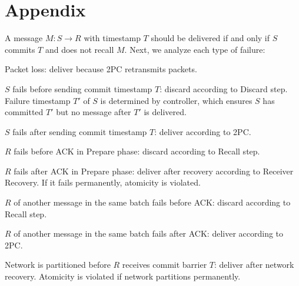\section{Appendix}
\label{appx:proof}


A message $M: S \rightarrow R$ with timestamp $T$ should be delivered if and only if $S$ commits $T$ and does not recall $M$. Next, we analyze each type of failure:
\begin{ecompact}
	\item Packet loss: deliver because 2PC retransmits packets.
	\item $S$ fails before sending commit timestamp $T$: discard according to Discard step. Failure timestamp $T'$ of $S$ is determined by controller, which ensures $S$ has committed $T'$ but no message after $T'$ is delivered.
	\item $S$ fails after sending commit timestamp $T$: deliver according to 2PC.
	\item $R$ fails before ACK in Prepare phase: discard according to Recall step.
	\item $R$ fails after ACK in Prepare phase: deliver after recovery according to Receiver Recovery. If it fails permanently, atomicity is violated.
	\item $R$ of another message in the same batch fails before ACK: discard according to Recall step.
	\item $R$ of another message in the same batch fails after ACK: deliver according to 2PC.
	\item Network is partitioned before $R$ receives commit barrier $T$: deliver after network recovery. Atomicity is violated if network partitions permanently.
\end{ecompact}


\iffalse
\newtheorem{theorem}{Theorem}
\theoremstyle{definition}
\newtheorem{definition}{Definition}
\newtheorem{property}{Property}
\newtheorem*{assump}{Assumption}
\newtheorem*{notation}{Notation}
\newtheorem{lemma}{Lemma}
\theoremstyle{remark}
\newtheorem*{rem}{Remark}
\newtheorem*{conclusion}{Conclusion}
\newtheorem*{note}{Note}
